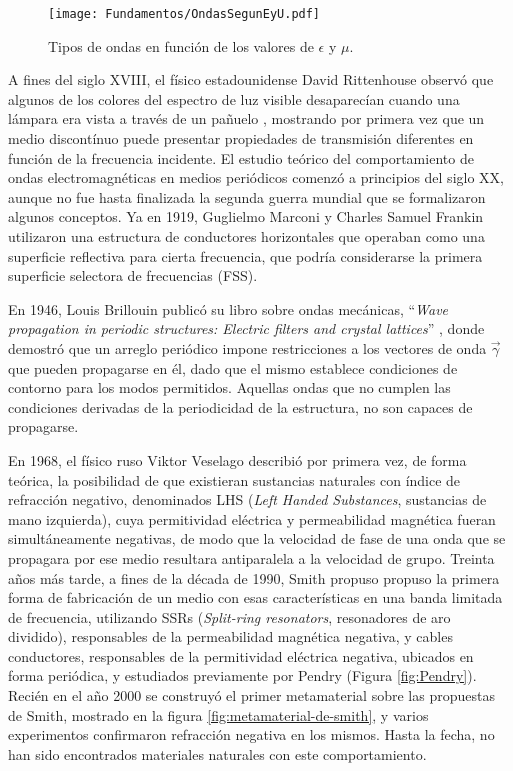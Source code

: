 \begin{figure}[htp]
	\centering
	\texttt{[image: Fundamentos/OndasSegunEyU.pdf]}
	\caption{Tipos de ondas en función de los valores de $\epsilon$ y $\mu$.}
	\label{fig:tablamuepsilon}
\end{figure}


A fines del siglo XVIII, el físico estadounidense David Rittenhouse observó que algunos de los colores del espectro de luz visible desaparecían cuando una lámpara era vista a través de un pañuelo \cite{Rittenhouse:OpticalProblem}, mostrando por primera vez que un medio discontínuo puede presentar propiedades de transmisión diferentes en función de la frecuencia incidente. El estudio teórico del comportamiento de ondas electromagnéticas en medios periódicos comenzó a principios del siglo XX, aunque no fue hasta finalizada la segunda guerra mundial que se formalizaron algunos conceptos. Ya en 1919, Guglielmo Marconi y Charles Samuel Frankin utilizaron una estructura de conductores horizontales que operaban como una superficie reflectiva para cierta frecuencia, que podría considerarse la primera superficie selectora de frecuencias (FSS).

En 1946, Louis Brillouin publicó su libro sobre ondas mecánicas, \enquote{\textit{Wave propagation in periodic structures: Electric filters and crystal lattices}} \cite{Brillouin:WavePropagation}, donde demostró que un arreglo periódico impone restricciones a los vectores de onda $\vec{\gamma}$ que pueden propagarse en él, dado que el mismo establece condiciones de contorno para los modos permitidos. Aquellas ondas que no cumplen las condiciones derivadas de la periodicidad de la estructura, no son capaces de propagarse.

En 1968, el físico ruso Viktor Veselago describió por primera vez, de forma teórica, la posibilidad de que existieran sustancias naturales con índice de refracción negativo, denominados LHS (\textit{Left Handed Substances}, sustancias de mano izquierda), cuya permitividad eléctrica y permeabilidad magnética fueran simultáneamente negativas, de modo que la velocidad de fase de una onda que se propagara por ese medio resultara antiparalela a la velocidad de grupo. Treinta años más tarde, a fines de la década de 1990, Smith propuso propuso la primera forma de fabricación de un medio con esas características en una banda limitada de frecuencia, utilizando SSRs (\textit{Split-ring resonators}, resonadores de aro dividido), responsables de la permeabilidad magnética negativa, y cables conductores, responsables de la permitividad eléctrica negativa, ubicados en forma periódica, y estudiados previamente por Pendry (Figura \ref{fig:Pendry}). Recién en el año 2000 se construyó el primer metamaterial sobre las propuestas de Smith, mostrado en la figura \ref{fig:metamaterial-de-smith}, y varios experimentos confirmaron refracción negativa en los mismos. Hasta la fecha, no han sido encontrados materiales naturales con este comportamiento.

